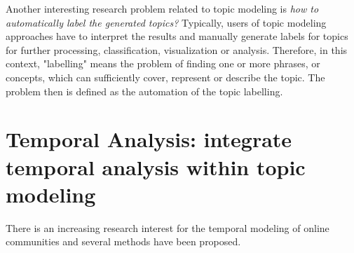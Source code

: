 Another interesting research problem related to topic modeling is \textit{how to automatically label the generated topics?} \cite{chp2cano2014automatictopiclabeling} \cite{chp2hulpus2013unsupervisedtopiclabeling} \cite{chp2aletras2014labelling} \cite{chp6OnConceptualLabelingOfBagOfWords} \cite{chp2lau2011automaticlabeling} 
Typically, users of topic modeling approaches have to interpret the results and manually generate labels for topics for further processing, classification, visualization or analysis. Therefore, in this context, "labelling" means the problem of finding one or more phrases, or concepts, which can sufficiently cover, represent or describe the topic. The problem then is defined as the automation of the topic labelling.



\section{Temporal Analysis: integrate temporal analysis within topic modeling}

There is an increasing research interest for the temporal modeling of online communities and several methods have been proposed. 

